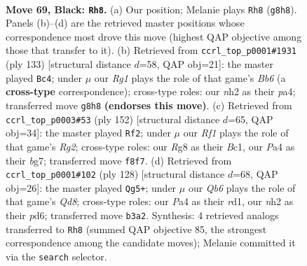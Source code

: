 \documentclass[11pt]{article}
\begin{document}
\clearpage

\begin{figure}[p]\centering
\begin{subfigure}{0.46\textwidth}\centering
\resizebox{\linewidth}{!}{%
\newchessgame
\chessboard[
  setfen={5rr1/p5p1/3Q3p/k2p3P/p2P2P1/1q2P3/7N/4b2K b - - 47 69},
  showmover=false,
  pgfstyle=straightmove, color=movearrow, markmove={g8-h8}
]}
\caption{}
\end{subfigure}\hfill
\begin{subfigure}{0.46\textwidth}\centering
\resizebox{\linewidth}{!}{%
\newchessgame
\chessboard[
  setfen={8/kr3p2/2Q1p1p1/p2pP3/P4P2/1b2P3/5K2/8 b - - 8 67},
  showmover=false,
  pgfstyle=straightmove, color=movearrow, markmove={b3-c4}
]}
\caption{}
\end{subfigure}
\\[4pt]
\begin{subfigure}{0.46\textwidth}\centering
\resizebox{\linewidth}{!}{%
\newchessgame
\chessboard[
  setfen={6k1/5pb1/3pn1p1/7p/4qP2/Q5PP/6RK/2B5 w - - 1 77},
  showmover=false,
  pgfstyle=straightmove, color=movearrow, markmove={g2-f2}
]}
\caption{}
\end{subfigure}\hfill
\begin{subfigure}{0.46\textwidth}\centering
\resizebox{\linewidth}{!}{%
\newchessgame
\chessboard[
  setfen={3Q4/5pk1/3p4/2qPp3/8/P4PP1/1P3RK1/3r4 w - - 15 65},
  showmover=false,
  pgfstyle=straightmove, color=movearrow, markmove={d8-g5}
]}
\caption{}
\end{subfigure}
\caption{\textbf{Move 69, Black: \texttt{Rh8}.} (a) Our position; Melanie plays \texttt{Rh8} (\texttt{g8h8}). Panels (b)--(d) are the retrieved master positions whose correspondence most drove this move (highest QAP objective among those that transfer to it). (b) Retrieved from \texttt{ccrl\_top\_p0001\#1931} (ply 133) [structural distance $d$=58, QAP obj=21]: the master played \texttt{Bc4}; under $\mu$ our \emph{Rg1} plays the role of that game's \emph{Bb6} (a \textbf{cross-type} correspondence); cross-type roles: our \emph{n}h2 as their \emph{p}a4; transferred move \texttt{g8h8} \textbf{(endorses this move)}. (c) Retrieved from \texttt{ccrl\_top\_p0003\#53} (ply 152) [structural distance $d$=65, QAP obj=34]: the master played \texttt{Rf2}; under $\mu$ our \emph{Rf1} plays the role of that game's \emph{Rg2}; cross-type roles: our \emph{R}g8 as their \emph{B}c1, our \emph{P}a4 as their \emph{b}g7; transferred move \texttt{f8f7}. (d) Retrieved from \texttt{ccrl\_top\_p0001\#102} (ply 128) [structural distance $d$=68, QAP obj=26]: the master played \texttt{Qg5+}; under $\mu$ our \emph{Qb6} plays the role of that game's \emph{Qd8}; cross-type roles: our \emph{P}a4 as their \emph{r}d1, our \emph{n}h2 as their \emph{p}d6; transferred move \texttt{b3a2}. Synthesis: 4 retrieved analogs transferred to \texttt{Rh8} (summed QAP objective 85, the strongest correspondence among the candidate moves); Melanie committed it via the \texttt{search} selector.}
\label{fig:thought-m137}
\end{figure}
\end{document}
